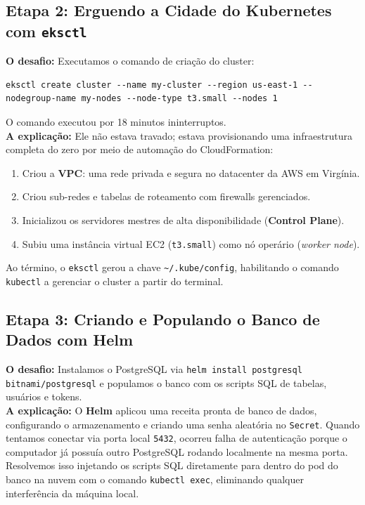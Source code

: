 \documentclass[11pt,a4paper]{article}
\begin{document}
\subsection{Etapa 2: Erguendo a Cidade do Kubernetes com \texttt{eksctl}}
\textbf{O desafio:} Executamos o comando de criação do cluster:
\begin{lstlisting}
eksctl create cluster --name my-cluster --region us-east-1 --nodegroup-name my-nodes --node-type t3.small --nodes 1
\end{lstlisting}
O comando executou por 18 minutos ininterruptos.\\
\textbf{A explicação:} Ele não estava travado; estava provisionando uma infraestrutura completa do zero por meio de automação do CloudFormation:
\begin{enumerate}
    \item Criou a \textbf{VPC}: uma rede privada e segura no datacenter da AWS em Virgínia.
    \item Criou sub-redes e tabelas de roteamento com firewalls gerenciados.
    \item Inicializou os servidores mestres de alta disponibilidade (\textbf{Control Plane}).
    \item Subiu uma instância virtual EC2 (\texttt{t3.small}) como nó operário (\textit{worker node}).
\end{enumerate}
Ao término, o \texttt{eksctl} gerou a chave \texttt{\textasciitilde/.kube/config}, habilitando o comando \texttt{kubectl} a gerenciar o cluster a partir do terminal.

\subsection{Etapa 3: Criando e Populando o Banco de Dados com Helm}
\textbf{O desafio:} Instalamos o PostgreSQL via \texttt{helm install postgresql bitnami/postgresql} e populamos o banco com os scripts SQL de tabelas, usuários e tokens.\\
\textbf{A explicação:} O \textbf{Helm} aplicou uma receita pronta de banco de dados, configurando o armazenamento e criando uma senha aleatória no \texttt{Secret}. Quando tentamos conectar via porta local \texttt{5432}, ocorreu falha de autenticação porque o computador já possuía outro PostgreSQL rodando localmente na mesma porta. Resolvemos isso injetando os scripts SQL diretamente para dentro do pod do banco na nuvem com o comando \texttt{kubectl exec}, eliminando qualquer interferência da máquina local.
\end{document}
